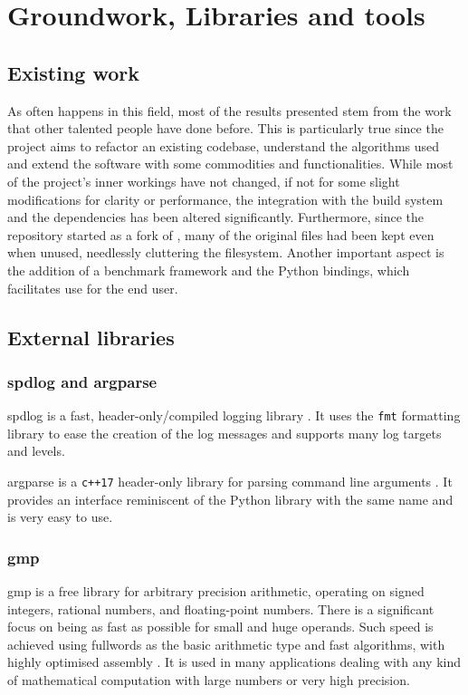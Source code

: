 \chapter{Groundwork, Libraries and tools}

\section{Existing work}

As often happens in this field, most of the results presented stem from the work that other talented people have done before.
This is particularly true since the project aims to refactor an existing codebase, understand the algorithms used and extend the software with some commodities and functionalities.
While most of the project's inner workings have not changed, if not for some slight modifications for clarity or performance, the integration with the build system and the dependencies has been altered significantly.
Furthermore, since the repository started as a fork of \dreal \cite{repo:dreal}, many of the original files had been kept even when unused, needlessly cluttering the filesystem.
Another important aspect is the addition of a benchmark framework and the Python bindings, which facilitates use for the end user.

\section{External libraries}

\subsection*{spdlog and argparse}

spdlog is a fast, header-only/compiled logging library \cite{repo:spdlog}.
It uses the \texttt{fmt} formatting library to ease the creation of the log messages and supports many log targets and levels.

argparse is a \texttt{c++17} header-only library for parsing command line arguments \cite{repo:argparse}.
It provides an interface reminiscent of the Python library with the same name and is very easy to use.

\subsection*{gmp}

gmp is a free library for arbitrary precision arithmetic, operating on signed integers, rational numbers, and floating-point numbers.
There is a significant focus on being as fast as possible for small and huge operands.
Such speed is achieved using fullwords as the basic arithmetic type and fast algorithms, with highly optimised assembly \cite{man:gmp}.
It is used in many applications dealing with any kind of mathematical computation with large numbers or very high precision.

